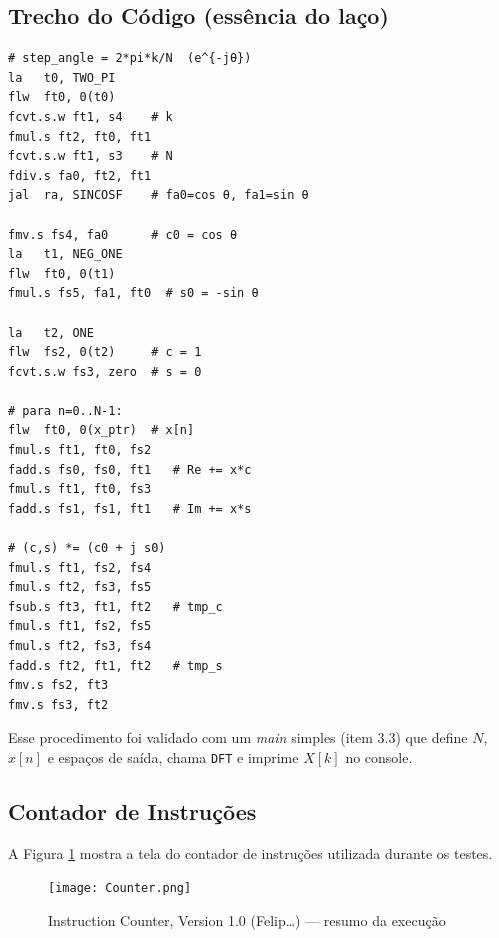\documentclass[12pt,a4paper]{article}
\begin{document}
\subsection*{Trecho do Código (essência do laço)}
\begin{lstlisting}[language=Assembly]
# step_angle = 2*pi*k/N  (e^{-jθ})
la   t0, TWO_PI
flw  ft0, 0(t0)
fcvt.s.w ft1, s4    # k
fmul.s ft2, ft0, ft1
fcvt.s.w ft1, s3    # N
fdiv.s fa0, ft2, ft1
jal  ra, SINCOSF    # fa0=cos θ, fa1=sin θ

fmv.s fs4, fa0      # c0 = cos θ
la   t1, NEG_ONE
flw  ft0, 0(t1)
fmul.s fs5, fa1, ft0  # s0 = -sin θ

la   t2, ONE
flw  fs2, 0(t2)     # c = 1
fcvt.s.w fs3, zero  # s = 0

# para n=0..N-1:
flw  ft0, 0(x_ptr)  # x[n]
fmul.s ft1, ft0, fs2
fadd.s fs0, fs0, ft1   # Re += x*c
fmul.s ft1, ft0, fs3
fadd.s fs1, fs1, ft1   # Im += x*s

# (c,s) *= (c0 + j s0)
fmul.s ft1, fs2, fs4
fmul.s ft2, fs3, fs5
fsub.s ft3, ft1, ft2   # tmp_c
fmul.s ft1, fs2, fs5
fmul.s ft2, fs3, fs4
fadd.s ft2, ft1, ft2   # tmp_s
fmv.s fs2, ft3
fmv.s fs3, ft2
\end{lstlisting}

Esse procedimento foi validado com um \textit{main} simples (item 3.3) que define $N$, $x[n]$ e espaços de saída, chama \texttt{DFT} e imprime $X[k]$ no console.

\subsection*{Contador de Instruções}
A Figura \ref{fig:counter} mostra a tela do contador de instruções utilizada durante os testes.
\begin{figure}[H]
\centering
\texttt{[image: Counter.png]}
\caption{Instruction Counter, Version 1.0 (Felip\dots) — resumo da execução}
\label{fig:counter}
\end{figure}
\end{document}
